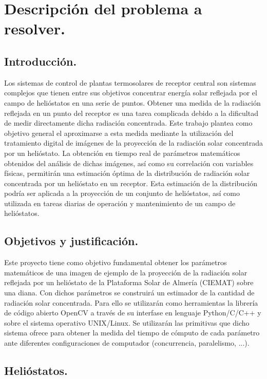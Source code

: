 \section{Descripción del problema a resolver.}

\subsection{Introducción.}

Los sistemas de control de plantas termosolares de receptor central son sistemas complejos que tienen entre sus objetivos concentrar energía solar reflejada por el campo de helióstatos en una serie de puntos. Obtener una medida de la radiación reflejada en un punto del receptor es una tarea complicada debido a la dificultad de medir directamente dicha radiación concentrada. Este trabajo plantea como objetivo general el aproximarse a esta medida mediante la utilización del tratamiento digital de imágenes de la proyección de la radiación solar concentrada por un helióstato.
La obtención en tiempo real de parámetros matemáticos obtenidos del análisis de dichas imágenes, así como su correlación con variables físicas, permitirán una estimación óptima de la distribución de radiación solar concentrada por un helióstato en un receptor. Esta estimación de la distribución podría ser aplicada a la proyección de un conjunto de helióstatos, así como utilizada en tareas diarias de operación y mantenimiento de un campo de helióstatos.

\subsection{Objetivos y justificación.}

Este proyecto tiene como objetivo fundamental obtener los parámetros matemáticos de una imagen de ejemplo de la proyección de la radiación solar reflejada por un helióstato de la Plataforma Solar de Almería (CIEMAT) sobre una diana. Con dichos parámetros se construirá un estimador de la cantidad de radiación solar concentrada.
Para ello se utilizarán como herramientas la librería de código abierto OpenCV a través de su interfase en lenguaje Python/C/C++ y sobre el sistema operativo UNIX/Linux. Se utilizarán las primitivas que dicho sistema ofrece para obtener la medida del tiempo de cómputo de cada parámetro ante diferentes configuraciones de computador (concurrencia, paralelismo, ...). \cite{OpenCVWebSite} \cite{SALWebSite} \cite{IEEEXploreWebSite}

\subsection{Helióstatos.}

